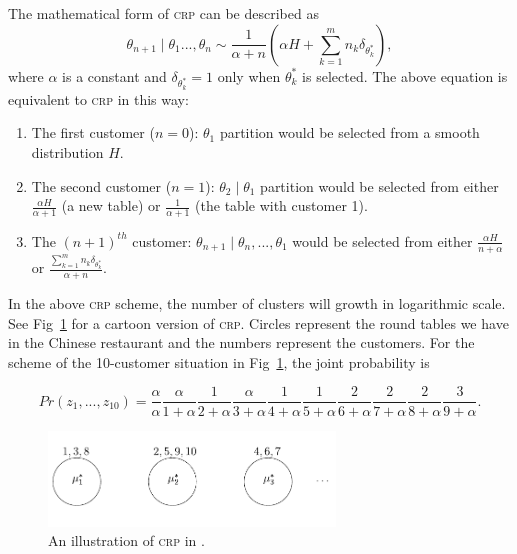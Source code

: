 \documentclass{ar-1col}
\begin{document}
The mathematical form of \textsc{crp} can be described as 
\begin{equation}
    \theta_{n+1} \mid \theta_1 ..., \theta_{n} \sim \frac{1}{\alpha + n} \left( \alpha H + \sum_{k = 1}^{m} n_k \delta_{\theta_{k}^*} \right),
    \label{eq:crp}
\end{equation}
where $\alpha$ is a constant and $\delta_{\theta_k^*} = 1$ only when $\theta_k^*$ is selected.
The above equation is equivalent to \textsc{crp} in this way: 
\begin{enumerate}
    \item The first customer ($n = 0$): $\theta_1$ partition would be selected from a smooth distribution $H$.
    \item The second customer ($n = 1$): $\theta_2 \mid \theta_1$ partition would be selected from either $\frac{\alpha H}{\alpha + 1}$ (a new table) or $\frac{1}{\alpha + 1}$ (the table with customer 1).
    \item The $(n + 1)^{th}$ customer: $\theta_{n + 1} \mid \theta_n, ..., \theta_1$ would be selected from either $\frac{\alpha H}{n + \alpha}$ or $ \frac{\sum_{k = 1}^{m} n_k \delta_{\theta_k^*}}{\alpha + n} $.
\end{enumerate}


In the above \textsc{crp} scheme, the number of clusters will growth in logarithmic scale.
See Fig~\ref{fig:crp} for a cartoon version of \textsc{crp}.
Circles represent the round tables we have in the Chinese restaurant and the numbers represent the customers.
For the scheme of the 10-customer situation in Fig~\ref{fig:crp}, the joint probability is

\begin{equation}
    Pr(z_1, ..., z_{10}) = 
        \frac{\alpha}{\alpha}
        \frac{\alpha}{1 + \alpha}
        \frac{1}{2 + \alpha}
        \frac{\alpha}{3 + \alpha}
        \frac{1}{4 + \alpha}
        \frac{1}{5 + \alpha}
        \frac{2}{6 + \alpha}
        \frac{2}{7 + \alpha}
        \frac{2}{8 + \alpha}
        \frac{3}{9 + \alpha}.
    \label{eq:crp}
\end{equation}


\begin{figure}
    \includegraphics[width=3in, height=1in]{images/chinese_restaurant.pdf}
    \caption{An illustration of \textsc{crp} in \citet{Blei2007}.}
    \label{fig:crp}
\end{figure}
\end{document}
